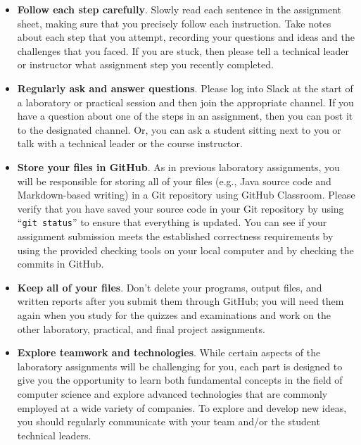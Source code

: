 \documentclass[11pt]{article}
\newcommand{\command}[1]{``\lstinline{#1}''}
\begin{document}
\begin{itemize}
  \setlength{\itemsep}{0pt}

\item {\bf Follow each step carefully}. Slowly read each sentence in the
  assignment sheet, making sure that you precisely follow each instruction. Take
  notes about each step that you attempt, recording your questions and ideas and
  the challenges that you faced. If you are stuck, then please tell a technical
  leader or instructor what assignment step you recently completed.

\item {\bf Regularly ask and answer questions}. Please log into Slack at the
  start of a laboratory or practical session and then join the appropriate
  channel. If you have a question about one of the steps in an assignment, then
  you can post it to the designated channel. Or, you can ask a student sitting
  next to you or talk with a technical leader or the course instructor.

\item {\bf Store your files in GitHub}. As in previous laboratory assignments,
  you will be responsible for storing all of your files (e.g., Java source code
  and Markdown-based writing) in a Git repository using GitHub Classroom. Please
  verify that you have saved your source code in your Git repository by using
  \command{git status} to ensure that everything is updated. You can see if your
  assignment submission meets the established correctness requirements by using
  the provided checking tools on your local computer and by checking the commits
  in GitHub.

\item {\bf Keep all of your files}. Don't delete your programs, output files,
  and written reports after you submit them through GitHub; you will need them
  again when you study for the quizzes and examinations and work on the other
  laboratory, practical, and final project assignments.

\item {\bf Explore teamwork and technologies}. While certain aspects of the
  laboratory assignments will be challenging for you, each part is designed to
  give you the opportunity to learn both fundamental concepts in the field of
  computer science and explore advanced technologies that are commonly employed
  at a wide variety of companies. To explore and develop new ideas, you should
  regularly communicate with your team and/or the student technical leaders.


\end{itemize}
\end{document}
